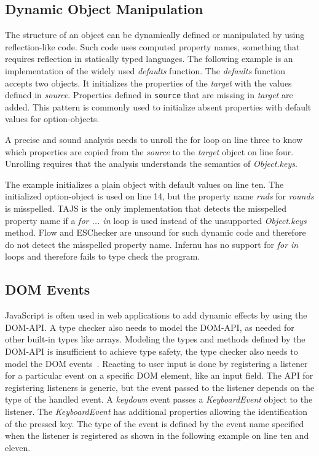 \subsection{Dynamic Object Manipulation}\label{ssec:dynamic-object-manipulation}
The structure of an object can be dynamically defined or manipulated by using reflection-like code. Such code uses computed property names, something that requires reflection in statically typed languages. The following example is an implementation of the widely used \textit{defaults} function. The \textit{defaults} function accepts two objects. It initializes the properties of the \textit{target} with the values defined in \textit{source}. Properties defined in \texttt{source} that are missing in \textit{target} are added. This pattern is commonly used to initialize absent properties with default values for option-objects.

A precise and sound analysis needs to unroll the for loop on line three to know which properties are copied from the \textit{source} to the \textit{target} object on line four. Unrolling requires that the analysis understands the semantics of \textit{Object.keys}. 

The example initializes a plain object with default values on line ten. The initialized option-object is used on line 14, but the property name \textit{rnds} for \textit{rounds} is misspelled. TAJS is the only implementation that detects the misspelled property name if a \textit{for ... in} loop is used instead of the unsupported \textit{Object.keys} method. Flow and ESChecker are unsound for such dynamic code and therefore do not detect the misspelled property name. Infernu has no support for \textit{for in} loops and therefore fails to type check the program.

\subsection{DOM Events}\label{ssec:dom-events}
JavaScript is often used in web applications to add dynamic effects by using the DOM-API. A type checker also needs to model the DOM-API, as needed for other built-in types like arrays. Modeling the types and methods defined by the DOM-API is insufficient to achieve type safety, the type checker also needs to model the DOM events~\cite{JensenMadsenMoller2011}. Reacting to user input is done by registering a listener for a particular event on a specific DOM element, like an input field. The API for registering listeners is generic, but the event passed to the listener depends on the type of the handled event. A \textit{keydown} event passes a \textit{KeyboardEvent} object to the listener. The \textit{KeyboardEvent} has additional properties allowing the identification of the pressed key. The type of the event is defined by the event name specified when the listener is registered as shown in the following example on line ten and eleven.


